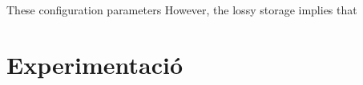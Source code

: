 



 These configuration parameters
However, the lossy storage implies that












\section{Experimentació}


